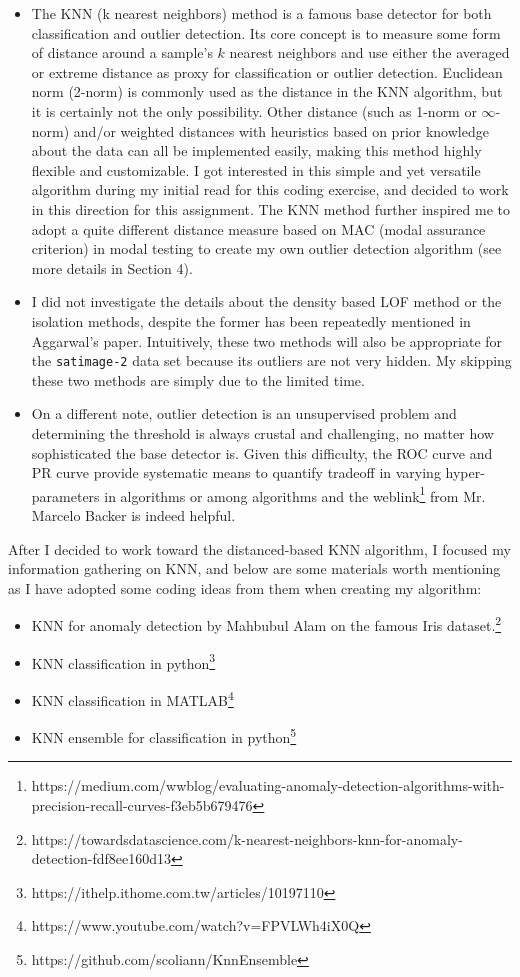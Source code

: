 \documentclass[12pt]{article}
\begin{document}
\begin{itemize}
	\item {The KNN (k nearest neighbors) method is a famous base detector for
	both classification and outlier detection. Its core concept is to measure
	some form of distance around a sample's $k$ nearest neighbors and use either the averaged or extreme distance
	as proxy for classification or outlier detection. Euclidean norm (2-norm) is commonly used as the distance in the KNN algorithm,
	but it is certainly not the only possibility. Other distance (such as 1-norm or $\infty$-norm) and/or weighted distances
	with heuristics based on prior knowledge about the data can all be implemented easily, making this method highly flexible and customizable.
	I got interested in this simple and yet versatile algorithm during my initial read for this coding exercise,
	and decided to work in this direction for this assignment.
	The KNN method further inspired me to adopt a quite different distance measure based on MAC (modal assurance criterion) in modal testing
	to create my own outlier detection algorithm (see more details in Section 4).
	}
	\item I did not investigate the details about the density based LOF method or the isolation methods,
	despite the former has been repeatedly mentioned in Aggarwal's paper. 
	Intuitively, these two methods will also be appropriate for the \texttt{satimage-2} data set because
	its outliers are not very hidden. My skipping these two methods are simply due to the limited time.
	\item On a different note, outlier detection is an unsupervised problem 
	and determining the threshold is always crustal and challenging, no matter how sophisticated 
	the base detector is. Given this difficulty, the ROC curve and PR curve provide systematic means to quantify tradeoff in 
	varying hyper-parameters in algorithms or among algorithms and the weblink\footnote{
	https://medium.com/wwblog/evaluating-anomaly-detection-algorithms-with-precision-recall-curves-f3eb5b679476
	} from Mr. Marcelo Backer is indeed helpful.
\end{itemize}

After I decided to work toward the distanced-based KNN algorithm, I focused my information gathering on KNN, 
and below are some materials worth mentioning as I have adopted some coding ideas from them when creating my algorithm:
\vspace{-1.5ex}
\begin{itemize}
	\itemsep0em
	\item KNN for anomaly detection by Mahbubul Alam on the famous Iris dataset.\footnote{https://towardsdatascience.com/k-nearest-neighbors-knn-for-anomaly-detection-fdf8ee160d13}
	\item KNN classification in python\footnote{https://ithelp.ithome.com.tw/articles/10197110}
	\item KNN classification in MATLAB\footnote{https://www.youtube.com/watch?v=FPVLWh4iX0Q}
	\item KNN ensemble for classification in python\footnote{https://github.com/scoliann/KnnEnsemble}
\end{itemize}
\end{document}

